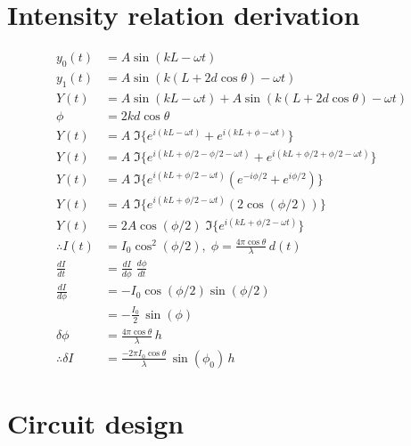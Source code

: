 \documentclass[prb,preprint]{revtex4-1}
\begin{document}
\section{Intensity relation derivation}
\begin{align}
    y_0(t) &= A \sin{(k L - \omega t)} \\
    y_1(t) &= A \sin{(k (L + 2 d \cos{\theta}) - \omega t)} \\
    Y(t) &= A \sin{(k L - \omega t)} + A \sin{(k (L + 2 d \cos{\theta}) - \omega t)} \\
    \phi &= 2 k d \cos{\theta} \\
    Y(t) &= A\; \Im\{e^{i (k L - \omega t)} + e^{i (k L + \phi - \omega t)}\} \\
    Y(t) &= A\; \Im\{e^{i (k L + \phi/2 - \phi/2 - \omega t)} + e^{i (k L + \phi/2 + \phi/2 - \omega t)}\} \\    
    Y(t) &= A\; \Im\{e^{i (k L + \phi/2 - \omega t)} (e^{- i \phi/2} + e^{i \phi/2})\} \\    
    Y(t) &= A\; \Im\{e^{i (k L + \phi/2 - \omega t)} (2 \cos{(\phi/2)})\} \\ 
    Y(t) &= 2 A \cos{(\phi/2)}\; \Im\{e^{i (k L + \phi/2 - \omega t)}\} \\  
    \therefore I(t) &= I_0 \cos^2{(\phi/2)}, \; \phi = \frac{4 \pi \cos{\theta}}{\lambda}\, d(t) \\
    \frac{dI}{dt} &= \frac{dI}{d\phi}\; \frac{d\phi}{dt}\\
    \frac{dI}{d\phi} &= - I_0 \cos{(\phi/2)} \sin{(\phi/2)}\\
    &= - \frac{I_0}{2}\, \sin{(\phi)}\\
    \delta\phi &= \frac{4 \pi \cos{\theta}}{\lambda}\, h\\
    \therefore \delta I &= \frac{- 2 \pi I_0 \cos{\theta}}{\lambda}\,\sin{(\phi_0)}\, h
\end{align}

\section{Circuit design}
\end{document}
